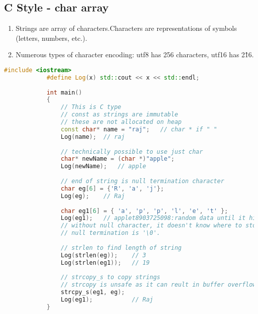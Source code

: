 \documentclass{article}
\begin{document}
    \subsection{C Style - char array}
        \begin{enumerate}
            \item Strings are array of characters.Characters are representations of symbols (letters, numbers, etc.). 
            \item Numerous types of character encoding: utf8 has 256 characters, utf16 has 2\^16. 
        \end{enumerate}        
        \begin{lstlisting}[language=C++, caption=C style char array]
            #include <iostream>
            #define Log(x) std::cout << x << std::endl;
            
            int main()
            {
            	// This is C type
            	// const as strings are immutable
            	// these are not allocated on heap
            	const char* name = "raj";	// char * if " "
            	Log(name);	// raj
            
            	// technically possible to use just char
            	char* newName = (char *)"apple";
            	Log(newName);	// apple
            
            	// end of string is null termination character
            	char eg[6] = {'R', 'a', 'j'};
            	Log(eg);	// Raj
            
            	char eg1[6] = { 'a', 'p', 'p', 'l', 'e', 't' };
            	Log(eg1);	// applet8903725098:random data until it hits null term 
            	// without null character, it doesn't know where to stop printing
            	// null termination is '\0'.
            	
        		// strlen to find length of string
            	Log(strlen(eg));	// 3
            	Log(strlen(eg1));	// 19
            	
            	// strcopy_s to copy strings
            	// strcopy is unsafe as it can reult in buffer overflow
            	strcpy_s(eg1, eg);
            	Log(eg1);			// Raj
            }
        \end{lstlisting}
        
\end{document}
